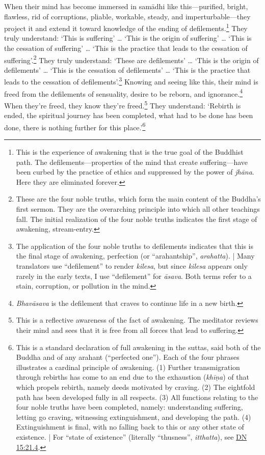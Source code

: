 \documentclass[12pt,openany]{book}%
\begin{document}
When their mind has become immersed in \textsanskrit{samādhi} like this—purified, bright, flawless, rid of corruptions, pliable, workable, steady, and imperturbable—they project it and extend it toward knowledge of the ending of defilements.\footnote{This is the experience of awakening that is the true goal of the Buddhist path. The defilements—properties of the mind that create suffering—have been curbed by the practice of ethics and suppressed by the power of \textit{\textsanskrit{jhāna}}. Here they are eliminated forever. } They truly understand: ‘This is suffering’ … ‘This is the origin of suffering’ … ‘This is the cessation of suffering’ … ‘This is the practice that leads to the cessation of suffering’.\footnote{These are the four noble truths, which form the main content of the Buddha’s first sermon. They are the overarching principle into which all other teachings fall. The initial realization of the four noble truths indicates the first stage of awakening, stream-entry. } They truly understand: ‘These are defilements’ … ‘This is the origin of defilements’ … ‘This is the cessation of defilements’ … ‘This is the practice that leads to the cessation of defilements’.\footnote{The application of the four noble truths to defilements indicates that this is the final stage of awakening, perfection (or “arahantship”, \textit{arahatta}). | Many translators use “defilement” to render \textit{kilesa}, but since \textit{kilesa} appears only rarely in the early texts, I use “defilement” for \textit{\textsanskrit{āsava}}. Both terms refer to a stain, corruption, or pollution in the mind. } Knowing and seeing like this, their mind is freed from the defilements of sensuality, desire to be reborn, and ignorance.\footnote{\textit{\textsanskrit{Bhavāsava}} is the defilement that craves to continue life in a new birth. } When they’re freed, they know they’re freed.\footnote{This is a reflective awareness of the fact of awakening. The meditator reviews their mind and sees that it is free from all forces that lead to suffering. } They understand: ‘Rebirth is ended, the spiritual journey has been completed, what had to be done has been done, there is nothing further for this place.’\footnote{This is a standard declaration of full awakening in the suttas, said both of the Buddha and of any arahant (“perfected one”). Each of the four phrases illustrates a cardinal principle of awakening. (1) Further transmigration through rebirths has come to an end due to the exhaustion (\textit{\textsanskrit{khīṇa}}) of that which propels rebirth, namely deeds motivated by craving. (2) The eightfold path has been developed fully in all respects. (3) All functions relating to the four noble truths have been completed, namely: understanding suffering, letting go craving, witnessing extinguishment, and developing the path. (4) Extinguishment is final, with no falling back to this or any other state of existence. | For “state of existence” (literally “thusness”, \textit{itthatta}), see \href{https://suttacentral.net/dn15/en/sujato\#21.4}{DN 15:21.4}. } 
\end{document}
